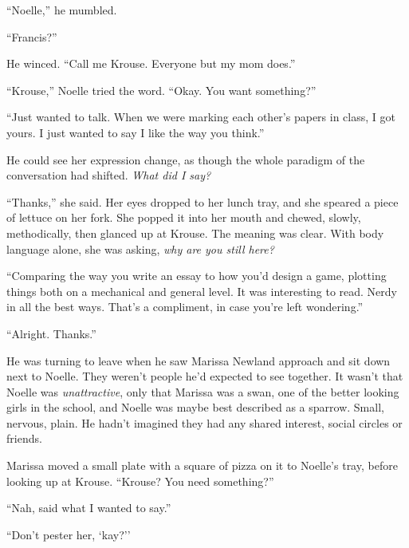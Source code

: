 ``Noelle,'' he mumbled.



``Francis?''



He winced.  ``Call me Krouse.  Everyone but my mom does.''



``Krouse,'' Noelle tried the word.  ``Okay.  You want something?''



``Just wanted to talk.  When we were marking each other's papers in class, I got yours.  I just wanted to say I like the way you think.''



He could see her expression change, as though the whole paradigm of the conversation had shifted.  \emph{What did I say?}



``Thanks,'' she said.  Her eyes dropped to her lunch tray, and she speared a piece of lettuce on her fork.  She popped it into her mouth and chewed, slowly, methodically, then glanced up at Krouse.  The meaning was clear.  With body language alone, she was asking, \emph{why are you still here?}



``Comparing the way you write an essay to how you'd design a game, plotting things both on a mechanical and general level.  It was interesting to read.  Nerdy in all the best ways.  That's a compliment, in case you're left wondering.''



``Alright.  Thanks.''



He was turning to leave when he saw Marissa Newland approach and sit down next to Noelle.  They weren't people he'd expected to see together.  It wasn't that Noelle was \emph{unattractive}, only that Marissa was a swan, one of the better looking girls in the school, and Noelle was maybe best described as a sparrow.  Small, nervous, plain.  He hadn't imagined they had any shared interest, social circles or friends.



Marissa moved a small plate with a square of pizza on it to Noelle's tray, before looking up at Krouse.  ``Krouse?  You need something?''



``Nah, said what I wanted to say.''



``Don't pester her, `kay?''



